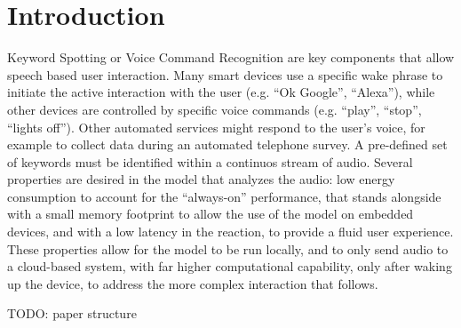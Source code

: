 
\section{Introduction}
\label{sec:introduction}


Keyword Spotting or Voice Command Recognition are key components that allow
speech based user interaction.
%
Many smart devices use a specific wake phrase to initiate the active
interaction with the user (e.g. ``Ok Google'', ``Alexa''), while other devices
are controlled by specific voice commands (e.g. ``play'', ``stop'', ``lights
off'').
%
Other automated services might respond to the user's voice, for example to
collect data during an automated telephone survey.
%
A pre-defined set of keywords must be identified within a continuos stream of
audio. Several properties are desired in the model that analyzes the audio: low
energy consumption to account for the ``always-on'' performance, that stands
alongside with a small memory footprint to allow the use of the model on
embedded devices, and with a low latency in the reaction, to provide a fluid
user experience.
%
These properties allow for the model to be run locally, and to only send audio
to a cloud-based system, with far higher computational capability, only after
waking up the device, to address the more complex interaction that follows.

TODO: paper structure


